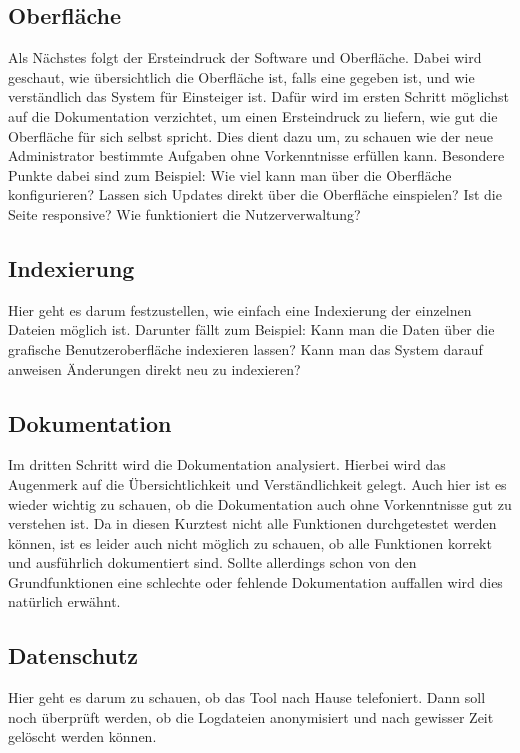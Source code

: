 \subsection{Oberfläche}

Als Nächstes folgt der Ersteindruck der Software und Oberfläche. Dabei wird geschaut, wie übersichtlich die Oberfläche ist, falls eine gegeben ist, und wie verständlich das System für Einsteiger ist. Dafür wird im ersten Schritt möglichst auf die Dokumentation verzichtet, um einen Ersteindruck zu liefern, wie gut die Oberfläche für sich selbst spricht. Dies dient dazu um, zu schauen wie der neue Administrator bestimmte Aufgaben ohne Vorkenntnisse erfüllen kann. Besondere Punkte dabei sind zum Beispiel: Wie viel kann man über die Oberfläche konfigurieren? Lassen sich Updates direkt über die Oberfläche einspielen? Ist die Seite responsive? Wie funktioniert die Nutzerverwaltung?

\subsection{Indexierung}

Hier geht es darum festzustellen, wie einfach eine Indexierung der einzelnen Dateien möglich ist. Darunter fällt zum Beispiel: Kann man die Daten über die grafische Benutzeroberfläche indexieren lassen? Kann man das System darauf anweisen Änderungen direkt neu zu indexieren?


\subsection{Dokumentation}

Im dritten Schritt wird die Dokumentation analysiert. Hierbei wird das Augenmerk auf die Übersichtlichkeit und Verständlichkeit gelegt. Auch hier ist es wieder wichtig zu schauen, ob die Dokumentation auch ohne Vorkenntnisse gut zu verstehen ist. Da in diesen Kurztest nicht alle Funktionen durchgetestet werden können, ist es leider auch nicht möglich zu schauen, ob alle Funktionen korrekt und ausführlich dokumentiert sind. Sollte allerdings schon von den Grundfunktionen eine schlechte oder fehlende Dokumentation auffallen wird dies natürlich erwähnt. 

\subsection{Datenschutz}

Hier geht es darum zu schauen, ob das Tool nach Hause telefoniert. Dann soll noch überprüft werden, ob die Logdateien anonymisiert und nach gewisser Zeit gelöscht werden können.


